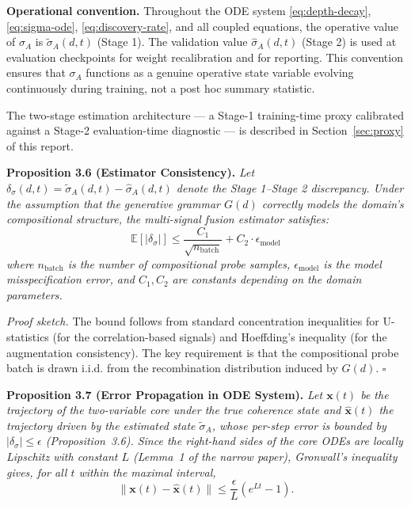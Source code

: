 \documentclass[11pt]{article}
\theoremstyle{definition}
\theoremstyle{plain}
\begin{document}
\textbf{Operational convention.} Throughout the ODE system
\eqref{eq:depth-decay}, \eqref{eq:sigma-ode},
\eqref{eq:discovery-rate}, and all coupled equations, the operative
value of $\sigma_A$ is $\tilde{\sigma}_A(d,t)$ (Stage 1). The validation
value $\hat{\sigma}_A(d,t)$ (Stage 2) is used at evaluation checkpoints
for weight recalibration and for reporting. This convention ensures that
$\sigma_A$ functions as a genuine operative state variable evolving
continuously during training, not a post hoc summary statistic.



The two-stage estimation architecture --- a Stage-1 training-time proxy calibrated
against a Stage-2 evaluation-time diagnostic --- is described in
Section~\ref{sec:proxy} of this report.

\textbf{Proposition 3.6 (Estimator Consistency).} %
\textit{Let $\delta_\sigma(d,t) = \tilde{\sigma}_A(d,t) - \hat{\sigma}_A(d,t)$
denote the Stage 1--Stage 2 discrepancy. Under the assumption that the
generative grammar $G(d)$ correctly models the domain's compositional
structure, the multi-signal fusion estimator satisfies:
\begin{equation}\label{eq:estimator-bound}
\mathbb{E}[|\delta_\sigma|] \leq \frac{C_1}{\sqrt{n_{\text{batch}}}} + C_2 \cdot \epsilon_{\text{model}}
\end{equation}
where $n_{\text{batch}}$ is the number of compositional probe samples,
$\epsilon_{\text{model}}$ is the model misspecification error, and $C_1, C_2$
are constants depending on the domain parameters.}

\textit{Proof sketch.} The bound follows from standard concentration
inequalities for U-statistics (for the correlation-based signals) and
Hoeffding's inequality (for the augmentation consistency). The key
requirement is that the compositional probe batch is drawn i.i.d. from
the recombination distribution induced by $G(d)$. $\square$

\textbf{Proposition 3.7 (Error Propagation in ODE System).} %
\textit{Let $\mathbf{x}(t)$ be the trajectory of the two-variable core under the true
coherence state and $\hat{\mathbf{x}}(t)$ the trajectory driven by the estimated state
$\tilde{\sigma}_A$, whose per-step error is bounded by $|\delta_\sigma| \leq \epsilon$
(Proposition~3.6). Since the right-hand sides of the core ODEs are locally Lipschitz with
constant $L$ (Lemma~1 of the narrow paper), Gronwall's inequality gives, for all $t$
within the maximal interval,
\begin{equation}\label{eq:error-prop}
\|\mathbf{x}(t) - \hat{\mathbf{x}}(t)\| \leq \frac{\epsilon}{L}\left(e^{Lt} - 1\right).
\end{equation}
}
\end{document}
